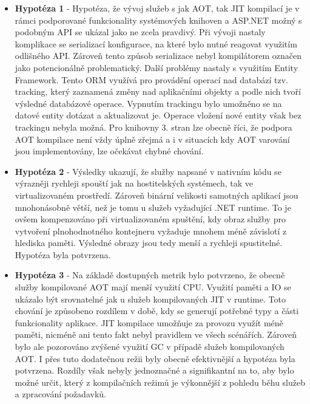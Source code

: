 \begin{itemize}
  \item \textbf{Hypotéza 1} - Hypotéza, že vývoj služeb s jak AOT, tak JIT kompilací je v rámci podporované funkcionality systémových knihoven a ASP.NET možný s podobným API se ukázal jako ne zcela pravdivý. Při vývoji nastaly komplikace se serializací konfigurace, na které bylo nutné reagovat využitím odlišného API. Zároveň tento způsob serializace nebyl kompilátorem označen jako potencionálně problematický. Další problémy nastaly s využitím Entity Framework. Tento ORM využívá pro provádění operací nad databází tzv. tracking, který zaznamená změny nad aplikačními objekty a podle nich tvoří výsledné databázové operace. Vypnutím trackingu bylo umožněno se na datové entity dotázat a aktualizovat je. Operace vložení nové entity však bez trackingu nebyla možná. Pro knihovny 3. stran lze obecně říci, že podpora AOT kompilace není vždy úplně zřejmá a i v situacích kdy AOT varování jsou implementovány, lze očekávat chybné chování.
  \item \textbf{Hypotéza 2} - Výsledky ukazují, že služby napsané v nativním kódu se výrazněji rychleji spouští jak na hostitelských systémech, tak ve virtualizovaném prostředí. Zároveň binární velikosti samotných aplikací jsou mnohonásobně větší, než je tomu u služeb vyžadující .NET runtime. To je ovšem kompenzováno při virtualizovaném spuštění, kdy obraz služby pro vytvoření plnohodnotného kontejneru vyžaduje mnohem méně závislotí z hlediska paměti. Výsledné obrazy jsou tedy menší a rychleji spustitelné. Hypotéza byla potvrzena.
  \item \textbf{Hypotéza 3} - Na základě dostupných metrik bylo potvrzeno, že obecně služby kompilované AOT mají menší využití CPU. Využití paměti a IO se ukázalo být srovnatelné jak u služeb kompilovaných JIT v runtime. Toto chování je způsobeno rozdílem v době, kdy se generují potřebné typy a části funkcionality aplikace. JIT kompilace umožňuje za provozu využít méně paměti, nicméně ani tento fakt nebyl pravidlem ve všech scénářích. Zároveň bylo ale pozorováno zvýšené využití GC v případě služeb kompilovaných AOT. I přes tuto dodatečnou režii byly obecně efektivnější a hypotéza byla potvrzena. Rozdíly však nebyly jednoznačné a signifikantní na to, aby bylo možné určit, který z kompilačních režimů je výkonnější z pohledu běhu služeb a zpracování požadavků.
\end{itemize}